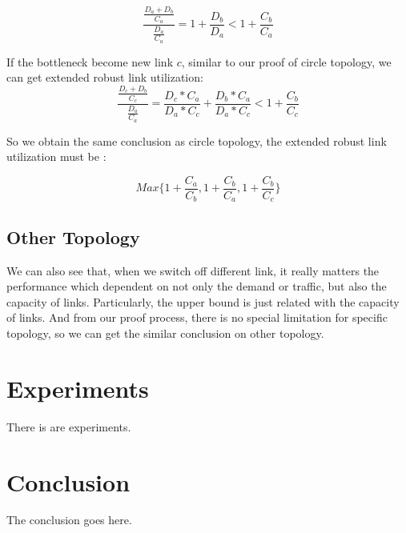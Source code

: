 \documentclass[conference]{IEEEtran}
\begin{document}
\begin{equation}
    \frac{\frac{D_a + D_b}{C_a}}{\frac{D_a}{C_a}} = 1 + \frac{D_b}{D_a} < 1 + \frac{C_b}{C_a}
\end{equation}

If the bottleneck become new link $c$, similar to our proof of circle topology, we can get extended robust link utilization:
\begin{equation}
    \frac{\frac{D_c + D_b}{C_c}}{\frac{D_a}{C_a}} = \frac{D_c * C_a}{D_a * C_c} + \frac{D_b * C_a}{D_a * C_c} < 1 + \frac{C_b}{C_c}
\end{equation}

So we obtain the same conclusion as circle topology, the extended robust link utilization must be :

\begin{equation}
    Max\{1 + \frac{C_a}{C_b}, 1 + \frac{C_b}{C_a}, 1 + \frac{C_b}{C_c}\}
\end{equation}

\subsection{Other Topology}
We can also see that, when we switch off different link, it really matters the performance which dependent on not only the 
demand or traffic, but also the capacity of links. Particularly, the upper bound is just related with the capacity of links.
And from our proof process, there is no special limitation for specific topology, so we can get the similar conclusion 
on other topology.


\section{Experiments}
There is are experiments.


\section{Conclusion}
The conclusion goes here.


\end{document}
